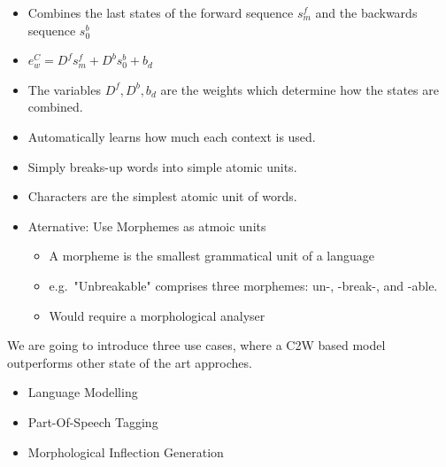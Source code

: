 \documentclass[11pt, a4paper, landscape]{article}
\begin{document}
\vfill
\begin{itemize}
\item Combines the last states of the forward sequence $s_{m}^f$ and the backwards sequence $s_{0}^b$
\item $e_{w}^C = D^f s_{m}^f + D^b s_{0}^b + b_d$
\item The variables $D^f, D^b, b_d$ are the weights which determine how the states are combined.
\item Automatically learns how much each context is used.
\end{itemize}
\vfill


\NewPage{}

\begin{itemize}
\item Simply breaks-up words into simple atomic units.
\item Characters are the simplest atomic unit of words.
\item Aternative: Use Morphemes as atmoic units
  \begin{itemize}
  \item A morpheme is the smallest grammatical unit of a language
  \item e.g.\ "Unbreakable" comprises three morphemes: un-, -break-, and -able.
  \item Would require a morphological analyser
  \end{itemize}
\end{itemize}
\vfill

\NewPage{}

\vfill
We are going to introduce three use cases, where a C2W based model outperforms
other state of the art approches.
\begin{itemize}
\item Language Modelling
\item Part-Of-Speech Tagging
\item Morphological Inflection Generation
\end{itemize}
\vfill


\NewPage{}
\end{document}
